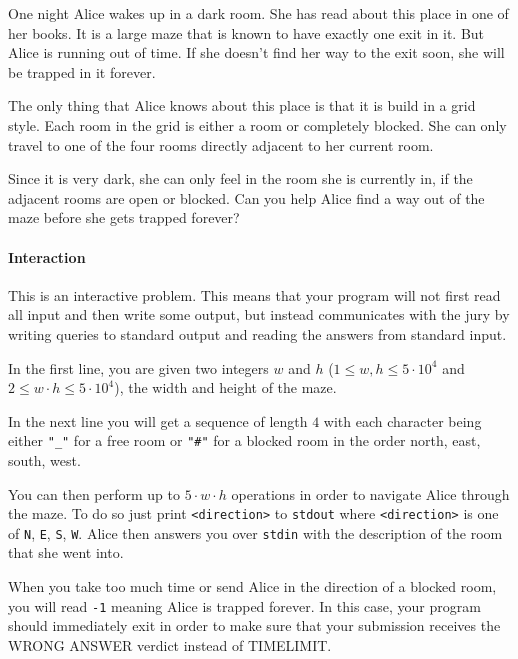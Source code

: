 



\makeheader

One night Alice wakes up in a dark room. She has read about this place in one of her books. It is a large maze that is known to have exactly one exit in it. But Alice is running out of time. If she doesn't find her way to the exit soon, she will be trapped in it forever.

The only thing that Alice knows about this place is that it is build in a grid style. Each room in the grid is either a room or completely blocked. She can only travel to one of the four rooms directly adjacent to her current room.

Since it is very dark, she can only feel in the room she is currently in, if the adjacent rooms are open or blocked. Can you help Alice find a way out of the maze before she gets trapped forever?

\paragraph*{Interaction}

This is an interactive problem. This means that your program will not first read all input and then write some output, but instead communicates with the jury by writing queries to standard output and reading the answers from standard input.

In the first line, you are given two integers $w$ and $h$ ($1 \leq w, h \leq 5 \cdot 10^4$ and $2\leq w \cdot h \leq 5 \cdot 10^4$), the width and height of the maze.

In the next line you will get a sequence of length $4$ with each character being either \texttt{"\_"} for a free room or \texttt{"\#"} for a blocked room in the order north, east, south, west.

You can then perform up to $5 \cdot w \cdot h$ operations in order to navigate Alice through the maze. To do so just print \texttt{<direction>} to \texttt{stdout} where \texttt{<direction>} is one of \texttt{N}, \texttt{E}, \texttt{S}, \texttt{W}. Alice then answers you over \texttt{stdin} with the description of the room that she went into. 

When you take too much time or send Alice in the direction of a blocked room, you will read \texttt{-1} meaning Alice is trapped forever. In this case, your program should immediately exit in order to make sure that your submission receives the WRONG ANSWER verdict instead of TIMELIMIT.

